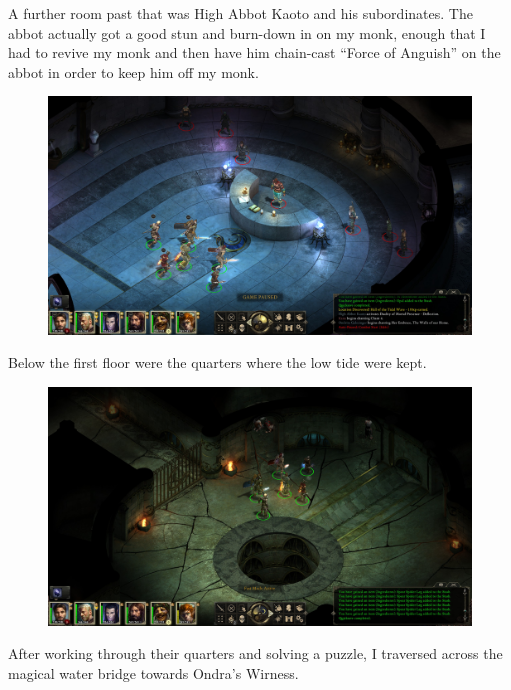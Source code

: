 \documentclass{article}
\begin{document}
A further room past that was High Abbot Kaoto and his subordinates.  The abbot actually got a good stun and burn-down in on my monk, enough that I had to revive my monk and then have him chain-cast ``Force of Anguish'' on the abbot in order to keep him off my monk.

\begin{figure}
\includegraphics[scale=0.33]{files/blog/2020_01_18_poe_potd_wmpt2/2020_01_18_abbey07.jpg}
\end{figure}

Below the first floor were the quarters where the low tide were kept.

\begin{figure}
\includegraphics[scale=0.33]{files/blog/2020_01_18_poe_potd_wmpt2/2020_01_18_abbey08.jpg}
\end{figure}

After working through their quarters and solving a puzzle, I traversed across the magical water bridge towards Ondra's Wirness.
\end{document}
